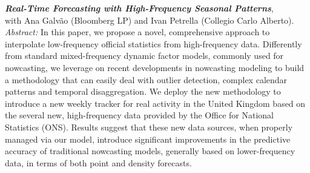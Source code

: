 \documentclass[a4paper,12pt]{article}
\begin{document}
\textit{\textbf{Real-Time Forecasting with High-Frequency Seasonal Patterns}},\\ with Ana Galv\~ao (Bloomberg LP) and Ivan Petrella (Collegio Carlo Alberto).\\[.5em]
\textit{Abstract:} In this paper, we propose a novel, comprehensive approach to interpolate low-frequency official statistics from high-frequency data. Differently from standard mixed-frequency dynamic factor models, commonly used for nowcasting, we leverage on recent developments in nowcasting modeling to build a methodology that can easily deal with outlier detection, complex calendar patterns and temporal disaggregation. We deploy the new methodology to introduce a new weekly tracker for real activity in the United Kingdom based on the several new, high-frequency data provided by the Office for National Statistics (ONS). Results suggest that these new data sources, when properly managed via our model, introduce significant improvements in the predictive accuracy of traditional nowcasting models, generally based on lower-frequency data, in terms of both point and density forecasts.
\end{document}
